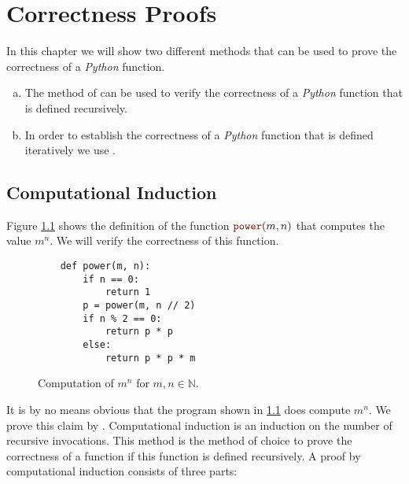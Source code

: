 \chapter{Correctness Proofs}
In this chapter we will show two different methods that can be used to prove the correctness of a \textsl{Python}
function.
\begin{enumerate}[(a)]
\item The method of  can be used to verify the correctness of a \textsl{Python}
      function that is defined recursively.
\item In order to establish the correctness of a \textsl{Python} function that is defined iteratively we use
      . 
\end{enumerate}

\section{Computational Induction}
Figure \ref{fig:power.py} shows the definition of the function $\mytt{power}(m,n)$ that computes
the value $m^n$.  We will verify the correctness of this function.

\begin{figure}[!h]
  \centering
\begin{verbatim}
    def power(m, n):
        if n == 0:
            return 1
        p = power(m, n // 2)
        if n % 2 == 0:
            return p * p
        else:
            return p * p * m
\end{verbatim}
\vspace*{-0.3cm}
  \caption{Computation of $m^n$ for $m,n \in \mathbb{N}$.}
  \label{fig:power.py}
\end{figure} 

It is by no means obvious that the program shown in \ref{fig:power.py} does compute
$m^n$.  We prove this claim by  .
Computational induction is an induction on the number of recursive invocations.
This method is the method of choice to prove the correctness of a function if this function is defined recursively.
A proof by computational induction consists of three parts:
\pagebreak

